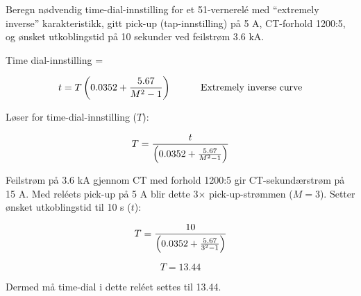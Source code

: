 

Beregn nødvendig time-dial-innstilling for et 51-vernerelé med ``extremely inverse'' karakteristikk, gitt pick-up (tap-innstilling) på 5 A, CT-forhold 1200:5, og ønsket utkoblingstid på 10 sekunder ved feilstrøm 3.6 kA.

\vskip 10pt

Time dial-innstilling = \underbar{\hskip 50pt}

\vskip 10pt







$$t = T \left(0.0352 + {5.67 \over {M^2 - 1}} \right) \hskip 30pt \hbox{Extremely inverse curve}$$

Løser for time-dial-innstilling ($T$):

$$T = {t \over \left(0.0352 + {5.67 \over {M^2 - 1}} \right)}$$

Feilstrøm på 3.6 kA gjennom CT med forhold 1200:5 gir CT-sekundærstrøm på 15 A. Med reléets pick-up på 5 A blir dette 3$\times$ pick-up-strømmen ($M = 3$). Setter ønsket utkoblingstid til 10 s ($t$):

$$T = {10 \over \left(0.0352 + {5.67 \over {3^2 - 1}} \right)}$$

$$T = 13.44$$

Dermed må time-dial i dette reléet settes til 13.44.









